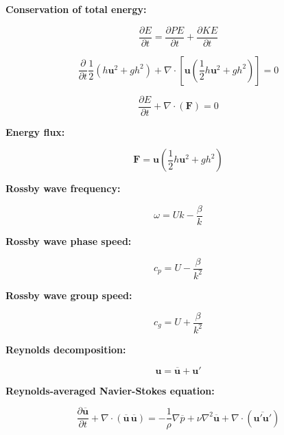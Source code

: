 \documentclass[12pt]{article}
\numberwithin{equation}{section}
\numberwithin{figure}{section}
\numberwithin{table}{section}
\begin{document}
\textbf{Conservation of total energy:}

\begin{equation}
  \frac{\partial E}{\partial t} = \frac{\partial PE}{\partial t} + \frac{\partial KE}{\partial t}
\end{equation}

\begin{equation}
  \frac{\partial}{\partial t} \frac{1}{2} \left(h\mathbf{u}^2 + gh^2\right)
  + \nabla \cdot \left[ \mathbf{u} \left( \frac{1}{2} h\mathbf{u}^2 + gh^2\right) \right] = 0
\end{equation}

\begin{equation}
  \frac{\partial E}{\partial t} + \nabla \cdot \left( \mathbf{F} \right) = 0
\end{equation}

\textbf{Energy flux:}

\begin{equation}
  \mathbf{F} = \mathbf{u} \left( \frac{1}{2} h\mathbf{u}^2 + gh^2\right)
\end{equation}

\textbf{Rossby wave frequency:}

\begin{equation}
  \omega = Uk - \frac{\beta}{k}
\end{equation}

\textbf{Rossby wave phase speed:}

\begin{equation}
  c_p = U - \frac{\beta}{k^2}
\end{equation}

\textbf{Rossby wave group speed:}

\begin{equation}
  c_g = U + \frac{\beta}{k^2}
\end{equation}

\textbf{Reynolds decomposition:}

\begin{equation}
  \mathbf{u} = \overline{\mathbf{u}} + \mathbf{u}'
\end{equation}

\textbf{Reynolds-averaged Navier-Stokes equation:}

\begin{equation}
  \frac{\partial \overline{\mathbf{u}}}{\partial t} +
  \nabla \cdot \left( \overline{\mathbf{u}}\, \overline{\mathbf{u}} \right) =
  - \frac{1}{\rho} \nabla \overline{p} +
  \nu \nabla^2 \overline{\mathbf{u}} +
  \nabla \cdot \left( \overline{\mathbf{u}' \mathbf{u}'} \right)
\end{equation}
\end{document}
